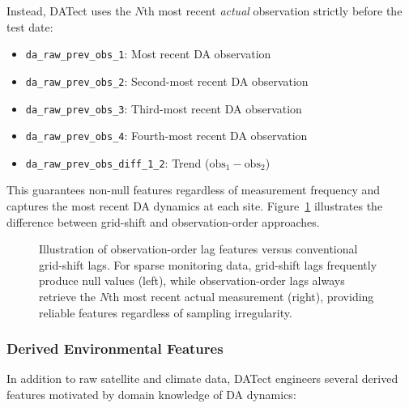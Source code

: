 \documentclass[preprint,12pt,authoryear]{elsarticle}
\begin{document}
Instead, DATect uses the $N$th most recent \textit{actual} observation strictly before the test date:
\begin{itemize}[nosep]
    \item \texttt{da\_raw\_prev\_obs\_1}: Most recent DA observation
    \item \texttt{da\_raw\_prev\_obs\_2}: Second-most recent DA observation
    \item \texttt{da\_raw\_prev\_obs\_3}: Third-most recent DA observation
    \item \texttt{da\_raw\_prev\_obs\_4}: Fourth-most recent DA observation
    \item \texttt{da\_raw\_prev\_obs\_diff\_1\_2}: Trend ($\text{obs}_1 - \text{obs}_2$)
\end{itemize}

This guarantees non-null features regardless of measurement frequency and captures the most recent DA dynamics at each site. Figure~\ref{fig:obs-order-lags} illustrates the difference between grid-shift and observation-order approaches.

\begin{figure}[!htbp]
\centering
{}
\caption{Illustration of observation-order lag features versus conventional grid-shift lags. For sparse monitoring data, grid-shift lags frequently produce null values (left), while observation-order lags always retrieve the $N$th most recent actual measurement (right), providing reliable features regardless of sampling irregularity.}
\label{fig:obs-order-lags}
\end{figure}

\subsubsection{Derived Environmental Features}

In addition to raw satellite and climate data, DATect engineers several derived features motivated by domain knowledge of DA dynamics:
\end{document}
